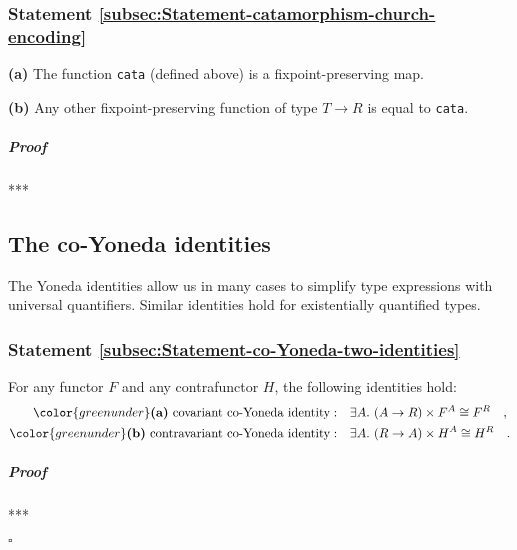 \subsubsection{Statement \label{subsec:Statement-catamorphism-church-encoding}\ref{subsec:Statement-catamorphism-church-encoding}}

\textbf{(a)} The function \lstinline!cata!
(defined above) is a fixpoint-preserving map.

\textbf{(b)} Any other fixpoint-preserving function of type $T\rightarrow R$
is equal to \lstinline!cata!.

\subparagraph{Proof}

{*}{*}{*}

\subsection{The co-Yoneda identities}

The Yoneda identities allow us in many cases to simplify type expressions
with universal quantifiers. Similar identities hold for existentially
quantified types. 

\subsubsection{Statement \label{subsec:Statement-co-Yoneda-two-identities}\ref{subsec:Statement-co-Yoneda-two-identities}}

For any functor $F$ and any contrafunctor $H$, the following identities
hold:
\begin{align*}
{\color{greenunder}\text{\textbf{(a)} }\text{covariant co-Yoneda identity}:}\quad & \exists A.\,\left(A\rightarrow R\right)\times F^{A}\cong F^{R}\quad,\\
{\color{greenunder}\text{\textbf{(b)} }\text{contravariant co-Yoneda identity}:}\quad & \exists A.\,\left(R\rightarrow A\right)\times H^{A}\cong H^{R}\quad.
\end{align*}


\subparagraph{Proof}

{*}{*}{*}

$\square$

